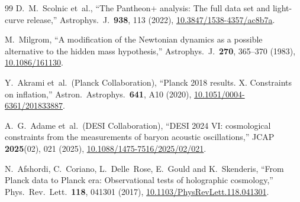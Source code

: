 \documentclass[aps,prd,twocolumn,superscriptaddress,nofootinbib]{revtex4-2}
\begin{document}
\begin{thebibliography}{99}
D.~M.~Scolnic et~al.,
``The Pantheon+ analysis: The full data set and light-curve release,''
Astrophys.\ J.\ \textbf{938}, 113 (2022),
\href{https://doi.org/10.3847/1538-4357/ac8b7a}{10.3847/1538-4357/ac8b7a}.

M.~Milgrom,
``A modification of the Newtonian dynamics as a possible alternative to the hidden mass hypothesis,''
Astrophys.\ J.\ \textbf{270}, 365--370 (1983),
\href{https://doi.org/10.1086/161130}{10.1086/161130}.

Y.~Akrami et~al.\ (Planck Collaboration),
``Planck 2018 results. X. Constraints on inflation,''
Astron.\ Astrophys.\ \textbf{641}, A10 (2020),
\href{https://doi.org/10.1051/0004-6361/201833887}{10.1051/0004-6361/201833887}.

A.~G.~Adame et~al.\ (DESI Collaboration),
``DESI 2024 VI: cosmological constraints from the measurements of baryon acoustic oscillations,''
JCAP \textbf{2025}(02), 021 (2025),
\href{https://doi.org/10.1088/1475-7516/2025/02/021}{10.1088/1475-7516/2025/02/021}.

N.~Afshordi, C.~Coriano, L.~Delle~Rose, E.~Gould and K.~Skenderis,
``From Planck data to Planck era: Observational tests of holographic cosmology,''
Phys.\ Rev.\ Lett.\ \textbf{118}, 041301 (2017),
\href{https://doi.org/10.1103/PhysRevLett.118.041301}{10.1103/PhysRevLett.118.041301}.

\end{thebibliography}
\end{document}
